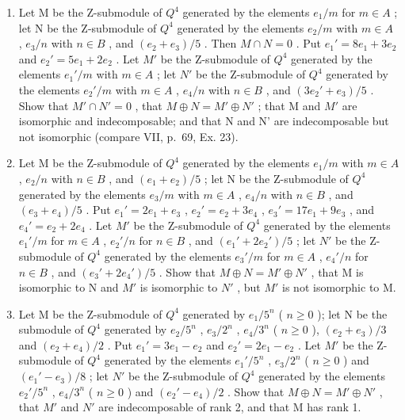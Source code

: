 \begin{enumerate}
\def\labelenumi{\alph{enumi})}
\item
  Let M be the Z-submodule of \(Q^{4}\) generated by the elements \(e_{1}/m\) for \(m \in A\) ; let N be the Z-submodule of \(Q^{4}\) generated by the elements \(e_{2}/m\) with \(m \in A\) , \(e_{3}/n\) with \(n \in B\) , and \((e_{2} + e_{3})/5\) . Then \(M \cap N = 0\) . Put \(e_{1}' = 8e_{1} + 3e_{2}\) and \(e_{2}' = 5e_{1} + 2e_{2}\) . Let \(M'\) be the Z-submodule of \(Q^{4}\) generated by the elements \(e_{1}'/m\) with \(m \in A\) ; let \(N'\) be the Z-submodule of \(Q^{4}\) generated by the elements \(e_{2}'/m\) with \(m \in A\) , \(e_{4}/n\) with \(n \in B\) , and \((3e_{2}' + e_{3})/5\) . Show that \(M' \cap N' = 0\) , that \(M \oplus N = M' \oplus N'\) ; that M and \(M'\) are isomorphic and indecomposable; and that N and N' are indecomposable but not isomorphic (compare VII, p.~69, Ex. 23).
\item
  Let M be the Z-submodule of \(Q^{4}\) generated by the elements \(e_{1}/m\) with \(m \in A\) , \(e_{2}/n\) with \(n \in B\) , and \((e_{1} + e_{2})/5\) ; let N be the Z-submodule of \(Q^{4}\) generated by the elements \(e_{3}/m\) with \(m \in A\) , \(e_{4}/n\) with \(n \in B\) , and \((e_{3} + e_{4})/5\) . Put \(e_{1}' = 2e_{1} + e_{3}\) , \(e_{2}' = e_{2} + 3e_{4}\) , \(e_{3}' = 17e_{1} + 9e_{3}\) , and \(e_{4}' = e_{2} + 2e_{4}\) . Let \(M'\) be the Z-submodule of \(Q^{4}\) generated by the elements \(e_{1}'/m\) for \(m \in A\) , \(e_{2}'/n\) for \(n \in B\) , and \((e_{1}' + 2e_{2}')/5\) ; let \(N'\) be the Z-submodule of \(Q^{4}\) generated by the elements \(e_{3}'/m\) for \(m \in A\) , \(e_{4}'/n\) for \(n \in B\) , and \((e_{3}' + 2e_{4}')/5\) . Show that \(M \oplus N = M' \oplus N'\) , that M is isomorphic to N and \(M'\) is isomorphic to \(N'\) , but \(M'\) is not isomorphic to M.
\item
  Let M be the Z-submodule of \(Q^{4}\) generated by \(e_{1}/5^{n}\) ( \(n \geqslant 0\) ); let N be the submodule of \(Q^{4}\) generated by \(e_{2}/5^{n}\) , \(e_{3}/2^{n}\) , \(e_{4}/3^{n}\) ( \(n \geqslant 0\) ), \((e_{2} + e_{3})/3\) and \((e_{2} + e_{4})/2\) . Put \(e_{1}' = 3e_{1} - e_{2}\) and \(e_{2}' = 2e_{1} - e_{2}\) . Let \(M'\) be the Z-submodule of \(Q^{4}\) generated by the elements \(e_{1}'/5^{n}\) , \(e_{3}/2^{n}\) ( \(n \geqslant 0\) ) and \((e_{1}' - e_{3})/8\) ; let \(N'\) be the Z-submodule of \(Q^{4}\) generated by the elements \(e_{2}'/5^{n}\) , \(e_{4}/3^{n}\) ( \(n \geqslant 0\) ) and \((e_{2}' - e_{4})/2\) . Show that \(M \oplus N = M' \oplus N'\) , that \(M'\) and \(N'\) are indecomposable of rank 2, and that M has rank 1.
\end{enumerate}
